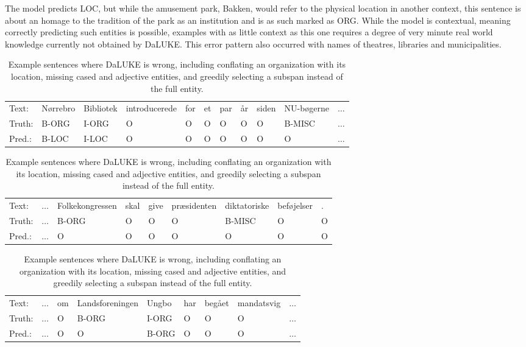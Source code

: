 \documentclass[main.tex]{subfiles}
\begin{document}
The model predicts LOC, but while the amusement park, Bakken, would refer to the physical location in another context, this sentence is about an homage to the tradition of the park as an institution and is as such marked as ORG.
While the model is contextual, meaning correctly predicting such entities is possible, examples with as little context as this one requires a degree of very minute real world knowledge currently not obtained by DaLUKE.
This error pattern also occurred with names of theatres, libraries and municipalities.
\begin{table}[H]
    \footnotesize
    \begin{tabular}{l|llllllllll}
        Text:   & Nørrebro  & Bibliotek  & introducerede  &for  &et  &par  &år  &siden  &NU-bøgerne & $\ldots$ \\
        Truth:  & B-ORG     & I-ORG      & O              &O    &O   &O    &O   &O      &B-MISC  & $\ldots$    \\
        Pred.:   & B-LOC     & I-LOC      & O              &O    &O   &O    &O   &O      &O   & $\ldots$\\\hline
    \end{tabular}\par
    \begin{tabular}{l|llllllll}
        Text:    & $\ldots$  &Folkekongressen  &skal  &give  &præsidenten  &diktatoriske  &beføjelser  &.\\
        Truth:   & $\ldots$  &B-ORG            &O     &O     &O            &B-MISC        &O           &O\\
        Pred.:   & $\ldots$  &O                &O     &O     &O            &O             &O           &O\\\hline
    \end{tabular}\par
    \begin{tabular}{l|llllllll}
        Text:    & $\ldots$ &  om  &Landsforeningen  &Ungbo  &har  &begået  &mandatsvig  & $\ldots$ \\
        Truth:   & $\ldots$ &  O   &B-ORG            &I-ORG  &O    &O       &O           & $\ldots$ \\
        Pred.:   & $\ldots$ &  O   &O                &B-ORG  &O    &O       &O           & $\ldots$
    \end{tabular}
    \caption{
        Example sentences where DaLUKE is wrong, including conflating an organization with its location, missing cased and adjective entities, and greedily selecting a subspan instead of the full entity.
    }
    \label{tab:dalukeerrors}
\end{table}\noindent
\end{document}
